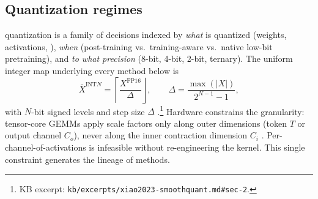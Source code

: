 \subsection{Quantization regimes}
\label{sec:quantization}

 quantization is a family of decisions indexed by \emph{what} is
quantized (weights, activations, ), \emph{when} (post-training
vs.\ training-aware vs.\ native low-bit pretraining), and \emph{to what
precision} (8-bit, 4-bit, 2-bit, ternary). The uniform integer map
underlying every method below is
\begin{equation}
\bar{X}^{\text{INT}N} = \left\lceil \frac{X^{\text{FP16}}}{\Delta} \right\rfloor,
\qquad
\Delta = \frac{\max(|X|)}{2^{N-1} - 1},
\label{eq:uniform-quant}
\end{equation}
with $N$-bit signed levels and step size $\Delta$
\citep[\S 2, Eq.~1]{xiao2023-smoothquant}.\footnote{KB excerpt:
\texttt{kb/excerpts/xiao2023-smoothquant.md\#sec-2}.} Hardware
constrains the granularity: tensor-core GEMMs apply scale factors only
along outer dimensions (token $T$ or output channel $C_o$), never along
the inner contraction dimension $C_i$
\citep[\S 3]{xiao2023-smoothquant}. Per-channel-of-activations is
infeasible without re-engineering the kernel. This single constraint
generates the lineage of methods.

